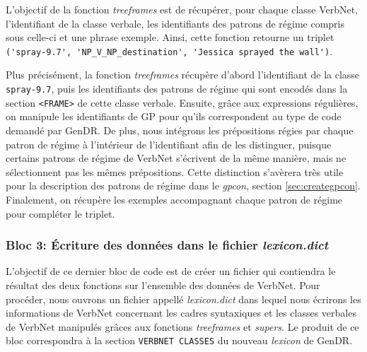 L'objectif de la fonction \emph{treeframes} est de récupérer, pour chaque classe VerbNet, l'identifiant de la classe verbale, les identifiants des patrons de régime compris sous celle-ci et une phrase exemple. Ainsi, cette fonction retourne un triplet \lstinline|('spray-9.7', 'NP_V_NP_destination', 'Jessica sprayed the wall')|.

Plus précisément, la fonction \emph{treeframes} récupère d'abord l'identifiant de la classe \texttt{spray-9.7}, puis les identifiants des patrons de régime qui sont encodés dans la section \texttt{<FRAME>} de cette classe verbale. Ensuite, grâce aux expressions régulières, on manipule les identifiants de \ac{GP} pour qu'ils correspondent au type de code demandé par GenDR. De plus, nous intégrons les prépositions régies par chaque patron de régime à l'intérieur de l'identifiant afin de les distinguer, puisque certains patrons de régime de VerbNet s'écrivent de la même manière, mais ne sélectionnent pas les mêmes prépositions. Cette distinction s'avèrera très utile pour la description des patrons de régime dans le \emph{gpcon}, section \ref{sec:creategpcon}. Finalement, on récupère les exemples accompagnant chaque patron de régime pour compléter le triplet.

\subsubsection{Bloc 3: Écriture des données dans le fichier \emph{lexicon.dict}}

L'objectif de ce dernier bloc de code est de créer un fichier qui contiendra le résultat des deux fonctions sur l'ensemble des données de VerbNet. Pour procéder, nous ouvrons un fichier appellé \emph{lexicon.dict} dans lequel nous écrirons les informations de VerbNet concernant les cadres syntaxiques et les classes verbales de VerbNet manipulés grâces aux fonctions \emph{treeframes} et \emph{supers}. Le produit de ce bloc correspondra à la section \texttt{VERBNET CLASSES} du nouveau \emph{lexicon} de GenDR.


